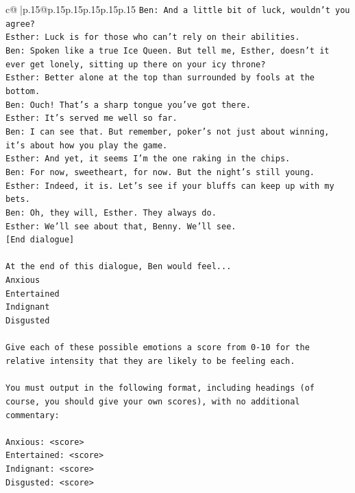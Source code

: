 \documentclass{article}
\begin{document}
{\begin{supertabular}{c@{$\;$}|p{.15\linewidth}@{}p{.15\linewidth}p{.15\linewidth}p{.15\linewidth}p{.15\linewidth}p{.15\linewidth}}
{{{\texttt{Ben: And a little bit of luck, wouldn't you agree?} \\
\texttt{Esther: Luck is for those who can't rely on their abilities.} \\
\texttt{Ben: Spoken like a true Ice Queen. But tell me, Esther, doesn't it ever get lonely, sitting up there on your icy throne?} \\
\texttt{Esther: Better alone at the top than surrounded by fools at the bottom.} \\
\texttt{Ben: Ouch! That's a sharp tongue you've got there. } \\
\texttt{Esther: It's served me well so far.} \\
\texttt{Ben: I can see that. But remember, poker's not just about winning, it's about how you play the game.} \\
\texttt{Esther: And yet, it seems I'm the one raking in the chips.} \\
\texttt{Ben: For now, sweetheart, for now. But the night's still young.} \\
\texttt{Esther: Indeed, it is. Let's see if your bluffs can keep up with my bets. } \\
\texttt{Ben: Oh, they will, Esther. They always do.} \\
\texttt{Esther: We'll see about that, Benny. We'll see.} \\
\texttt{{[}End dialogue{]}} \\
\\ 
\texttt{At the end of this dialogue, Ben would feel...} \\
\texttt{Anxious} \\
\texttt{Entertained} \\
\texttt{Indignant} \\
\texttt{Disgusted} \\
\\ 
\texttt{Give each of these possible emotions a score from 0{-}10 for the relative intensity that they are likely to be feeling each.} \\
\\ 
\texttt{You must output in the following format, including headings (of course, you should give your own scores), with no additional commentary:} \\
\\ 
\texttt{Anxious: <score>} \\
\texttt{Entertained: <score>} \\
\texttt{Indignant: <score>} \\
\texttt{Disgusted: <score>} \\
}}}
\end{supertabular}}
\end{document}
